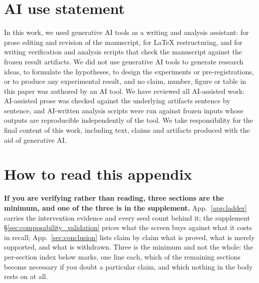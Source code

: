 \documentclass{article}
\begin{document}
\section*{AI use statement}

In this work, we used generative AI tools as a writing and analysis assistant: for prose
editing and revision of the manuscript, for \LaTeX{} restructuring, and for writing
verification and analysis scripts that check the manuscript against the frozen result
artifacts. We did not use generative AI tools to generate research ideas, to formulate the
hypotheses, to design the experiments or pre-registrations, or to produce any experimental
result, and no claim, number, figure or table in this paper was authored by an AI tool. We
have reviewed all AI-assisted work: AI-assisted prose was checked against the underlying
artifacts sentence by sentence, and AI-written analysis scripts were run against frozen
inputs whose outputs are reproducible independently of the tool. We take responsibility for
the final content of this work, including text, claims and artifacts produced with the aid
of generative AI.




\appendix

\small
\setlength{\textfloatsep}{6pt plus 2pt minus 2pt}
\setlength{\intextsep}{6pt plus 2pt minus 2pt}
\setlength{\abovecaptionskip}{4pt}
\setlength{\belowcaptionskip}{2pt}
\setlength{\tabcolsep}{4pt}
\setcounter{table}{0}\setcounter{figure}{0}
\renewcommand{\thetable}{A\arabic{table}}
\renewcommand{\thefigure}{A\arabic{figure}}

\section*{How to read this appendix}
\noindent \textbf{If you are verifying rather than reading, three sections are the minimum, and one of the three is in the supplement.}
App.~\ref{app:ladder} carries the intervention evidence and every seed count behind it;
the supplement §\ref{sec:composability_validation} prices what the screen buys against what it costs in recall;
App.~\ref{sec:conclusion} lists claim by claim what is proved, what is merely supported, and what is
withdrawn. Three is the minimum and not the whole: the per-section index below marks, one line each,
which of the remaining sections become necessary if you doubt a particular claim, and which nothing in
the body rests on at all.
\end{document}
